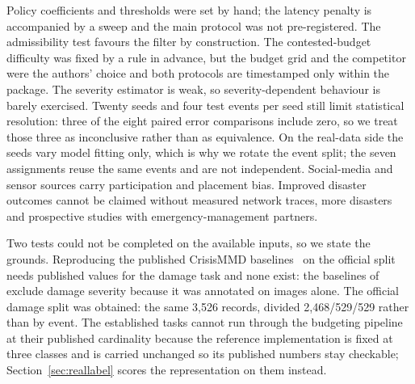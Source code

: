 \documentclass[conference,a4paper]{IEEEtran}
\begin{document}
Policy coefficients and thresholds were set by hand; the latency penalty is accompanied by a sweep and the main protocol was not pre-registered. The admissibility test favours the filter by construction. The contested-budget difficulty was fixed by a rule in advance, but the budget grid and the competitor were the authors' choice and both protocols are timestamped only within the package. The severity estimator is weak, so severity-dependent behaviour is barely exercised. Twenty seeds and four test events per seed still limit statistical resolution: three of the eight paired error comparisons include zero, so we treat those three as inconclusive rather than as equivalence. On the real-data side the seeds vary model fitting only, which is why we rotate the event split; the seven assignments reuse the same events and are not independent. Social-media and sensor sources carry participation and placement bias. Improved disaster outcomes cannot be claimed without measured network traces, more disasters and prospective studies with emergency-management partners.


Two tests could not be completed on the available inputs, so we state the grounds. Reproducing the published CrisisMMD baselines~\cite{crisismmd} on the official split needs published values for the damage task and none exist: the baselines of~\cite{ofli2020} exclude damage severity because it was annotated on images alone. The official damage split was obtained: the same 3,526 records, divided 2,468/529/529 rather than by event. The established tasks cannot run through the budgeting pipeline at their published cardinality because the reference implementation is fixed at three classes and is carried unchanged so its published numbers stay checkable; Section~\ref{sec:reallabel} scores the representation on them instead.
\end{document}
